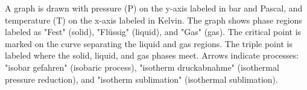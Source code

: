 A graph is drawn with pressure (P) on the y-axis labeled in bar and Pascal, and temperature (T) on the x-axis labeled in Kelvin. The graph shows phase regions labeled as "Fest" (solid), "Flüssig" (liquid), and "Gas" (gas). The critical point is marked on the curve separating the liquid and gas regions. The triple point is labeled where the solid, liquid, and gas phases meet. Arrows indicate processes: "isobar gefahren" (isobaric process), "isotherm druckabnahme" (isothermal pressure reduction), and "isotherm sublimation" (isothermal sublimation).